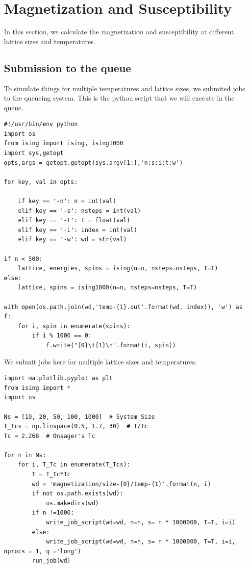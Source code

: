 \documentclass{article}
\begin{document}
\section{Magnetization and Susceptibility}
\label{sec-5}
In this section, we calculate the magnetization and susceptibility at different lattice sizes and temperatures. 

\subsection{Submission to the queue}
\label{sec-5-1}

To simulate things for multiple temperatures and lattice sizes, we submited jobs to the queueing system. This is the python script that we will execute in the queue.

\begin{verbatim}
#!/usr/bin/env python
import os
from ising import ising, ising1000
import sys,getopt
opts,args = getopt.getopt(sys.argv[1:],'n:s:i:t:w')

for key, val in opts:

    if key == '-n': n = int(val)
    elif key == '-s': nsteps = int(val)
    elif key == '-t': T = float(val)
    elif key == '-i': index = int(val)
    elif key == '-w': wd = str(val)

if n < 500:
    lattice, energies, spins = ising(n=n, nsteps=nsteps, T=T)
else:
    lattice, spins = ising1000(n=n, nsteps=nsteps, T=T)
    
with open(os.path.join(wd,'temp-{1}.out'.format(wd, index)), 'w') as f:
    for i, spin in enumerate(spins):
        if i % 1000 == 0:
            f.write("{0}\t{1}\n".format(i, spin))
\end{verbatim}

We submit jobs here for multiple lattice sizes and temperatures.

\begin{verbatim}
import matplotlib.pyplot as plt
from ising import *
import os

Ns = [10, 20, 50, 100, 1000]  # System Size
T_Tcs = np.linspace(0.5, 1.7, 30)  # T/Tc
Tc = 2.268  # Onsager's Tc

for n in Ns:
    for i, T_Tc in enumerate(T_Tcs):
        T = T_Tc*Tc
        wd = 'magnetization/size-{0}/temp-{1}'.format(n, i)
        if not os.path.exists(wd): 
            os.makedirs(wd)
        if n !=1000:
            write_job_script(wd=wd, n=n, s= n * 1000000, T=T, i=i)
        else:
            write_job_script(wd=wd, n=n, s= n * 1000000, T=T, i=i, nprocs = 1, q ='long')
        run_job(wd)
\end{verbatim}
\end{document}
